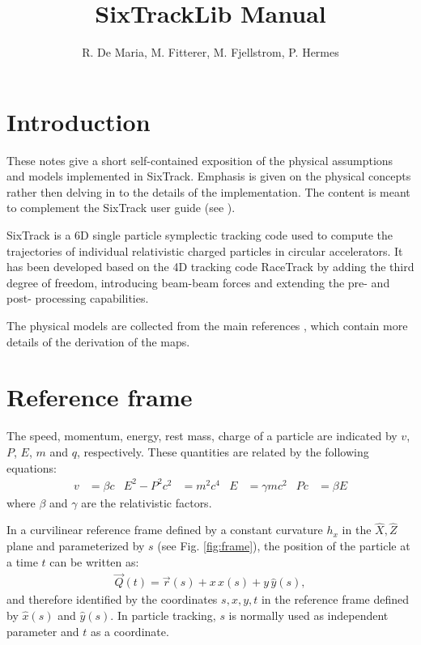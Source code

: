\documentclass[english]{article}
\title{SixTrackLib Manual}
\author{R. De Maria, M. Fitterer, M. Fjellstrom, P. Hermes }
\begin{document}
  \maketitle 
  
  


\section{Introduction}

These notes give a short self-contained exposition of the physical assumptions
and models implemented in SixTrack. Emphasis is given on the physical concepts
rather then delving in to the details of the implementation.  The content is
meant to complement the SixTrack user guide (see \cite{user_guide}).

SixTrack is a 6D single particle symplectic tracking code used to compute the
trajectories of individual relativistic charged particles in circular
accelerators. It has been developed based on the 4D tracking code RaceTrack
\cite{racetrack} by adding the third degree of freedom, introducing beam-beam
forces and extending the pre- and post- processing capabilities.

The physical models are collected from the main references
\cite{ripken85,barber87,ripken95,heinemann95,barber96,beam_beam,rf_multipoles},
which contain more details of the derivation of the maps.


\section{Reference frame}

The speed, momentum, energy, rest mass, charge of a particle are indicated
by $v$, $P$, $E$, $m$ and $q$, respectively.  These quantities are
related by the following equations:
\begin{align}
  v&=\beta c &
  E^2-P^2c^2&=m^2c^4 &
  E & = \gamma mc^2 &
  Pc & =\beta E
\end{align}
where $\beta$ and $\gamma$ are the relativistic factors.

In a curvilinear reference frame defined by a constant curvature $h_x$ in the
$\hat X, \hat Z$ plane and parameterized by $s$  (see Fig. \ref{fig:frame}), the
position of the particle at a time $t$ can be written as:
\begin{align}
  \vec Q(t)= \vec r(s) + x \,\hat x(s) + y\, \hat y(s),
\end{align}
and therefore identified by the coordinates $s, x, y, t$ in the reference frame
defined by $\hat x(s)$ and $\hat y(s)$. In particle tracking, $s$ is normally
used as independent parameter and $t$ as a coordinate.
\end{document}
